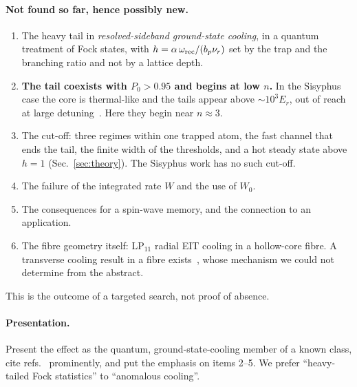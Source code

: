 \documentclass[11pt,a4paper]{article}
\newcommand{\nur}{\nu_r}
\begin{document}
\paragraph{Not found so far, hence possibly new.}
\begin{enumerate}
\item The heavy tail in \emph{resolved-sideband ground-state cooling}, in a quantum treatment of Fock states, with $h=\alpha\,\omega_{\rm rec}/(b_p\nur)$ set by the trap and the branching ratio and not by a lattice depth.
\item \textbf{The tail coexists with $P_0>0.95$ and begins at low $n$.} In the Sisyphus case the core is thermal-like and the tails appear above $\sim10^3E_r$, out of reach at large detuning~\cite{dechant2016}. Here they begin near $n\approx3$.
\item The cut-off: three regimes within one trapped atom, the fast channel that ends the tail, the finite width of the thresholds, and a hot steady state above $h=1$ (Sec.~\ref{sec:theory}). The Sisyphus work has no such cut-off.
\item The failure of the integrated rate $W$ and the use of $W_0$.
\item The consequences for a spin-wave memory, and the connection to an application.
\item The fibre geometry itself: LP$_{11}$ radial EIT cooling in a hollow-core fibre. A transverse cooling result in a fibre exists~\cite{anderson2024}, whose mechanism we could not determine from the abstract.
\end{enumerate}
This is the outcome of a targeted search, not proof of absence.

\paragraph{Presentation.} Present the effect as the quantum, ground-state-cooling member of a known class, cite refs.~\cite{dechant2015,dechant2016} prominently, and put the emphasis on items 2--5. We prefer ``heavy-tailed Fock statistics'' to ``anomalous cooling''.

\end{document}
